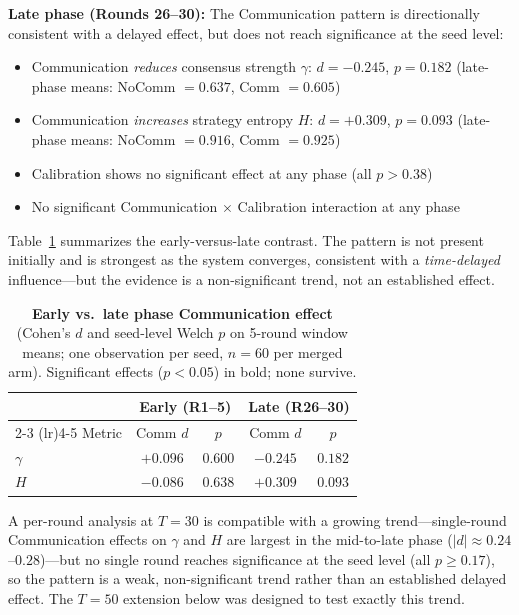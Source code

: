 \documentclass[11pt]{article}
\theoremstyle{definition}
\theoremstyle{remark}
\begin{document}
\textbf{Late phase (Rounds 26--30):} The Communication pattern is directionally consistent with a delayed effect, but does not reach significance at the seed level:

\begin{itemize}[leftmargin=*,nosep]
    \item Communication \textit{reduces} consensus strength $\gamma$: $d{=}-0.245$, $p{=}0.182$ (late-phase means: NoComm $=0.637$, Comm $=0.605$)
    \item Communication \textit{increases} strategy entropy $H$: $d{=}+0.309$, $p{=}0.093$ (late-phase means: NoComm $=0.916$, Comm $=0.925$)
    \item Calibration shows no significant effect at any phase (all $p > 0.38$)
    \item No significant Communication $\times$ Calibration interaction at any phase
\end{itemize}

Table~\ref{tab:joint_early_late} summarizes the early-versus-late contrast. The pattern is not present initially and is strongest as the system converges, consistent with a \textit{time-delayed} influence---but the evidence is a non-significant trend, not an established effect.

\begin{table}[H]
\centering
\caption{\textbf{Early vs.\ late phase Communication effect} (Cohen's $d$ and seed-level Welch $p$ on 5-round window means; one observation per seed, $n{=}60$ per merged arm). Significant effects ($p < 0.05$) in bold; none survive.}
\label{tab:joint_early_late}
\begin{tabular}{@{}lcccc@{}}
\toprule
 & \multicolumn{2}{c}{Early (R1--5)} & \multicolumn{2}{c}{Late (R26--30)} \\
\cmidrule(lr){2-3} \cmidrule(lr){4-5}
Metric & Comm $d$ & $p$ & Comm $d$ & $p$ \\
\midrule
$\gamma$ & $+0.096$ & $0.600$ & $-0.245$ & $0.182$ \\
$H$ & $-0.086$ & $0.638$ & $+0.309$ & $0.093$ \\
\bottomrule
\end{tabular}
\end{table}

A per-round analysis at $T{=}30$ is compatible with a growing trend---single-round Communication effects on $\gamma$ and $H$ are largest in the mid-to-late phase ($|d| \approx 0.24$--$0.28$)---but no single round reaches significance at the seed level (all $p \geq 0.17$), so the pattern is a weak, non-significant trend rather than an established delayed effect. The $T{=}50$ extension below was designed to test exactly this trend.
\end{document}
